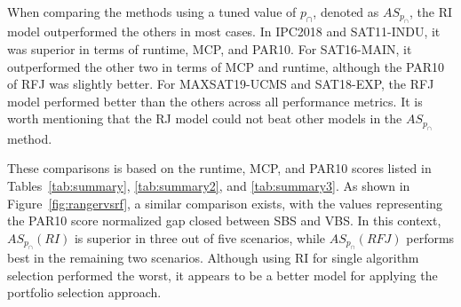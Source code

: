 When comparing the methods using a tuned value of $p_{\cap}$, denoted as $AS_{p_{\cap}}$, the RI model outperformed the others in most cases. In IPC2018 and SAT11-INDU, it was superior in terms of runtime, MCP, and PAR10. For SAT16-MAIN, it outperformed the other two in terms of MCP and runtime, although the PAR10 of RFJ was slightly better. For MAXSAT19-UCMS and SAT18-EXP, the RFJ model performed better than the others across all performance metrics. It is worth mentioning that the RJ model could not beat other models in the $AS_{p_{\cap}}$ method. 

These comparisons is based on the runtime, MCP, and PAR10 scores listed in Tables~\ref{tab:summary}, \ref{tab:summary2}, and \ref{tab:summary3}. As shown in Figure~\ref{fig:rangervsrf}, a similar comparison exists, with the values representing the PAR10 score normalized gap closed between SBS and VBS. In this context, $AS_{p_{\cap}} (RI)$ is superior in three out of five scenarios, while $AS_{p_{\cap}} (RFJ)$ performs best in the remaining two scenarios. Although using RI for single algorithm selection performed the worst, it appears to be a better model for applying the portfolio selection approach. 

